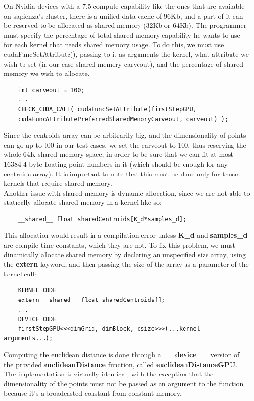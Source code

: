 \documentclass{article}
\begin{document}
On Nvidia devices with a 7.5 compute capability like the ones that are available on sapienza's cluster, there is a unified data cache of 96Kb, and a part of it can be reserved to be allocated as shared memory (32Kb or 64Kb). The programmer must specify the percentage of total shared memory capability he wants to use for each kernel that needs shared memory usage. To do this, we must use cudaFuncSetAttribute(), passing to it as arguments the kernel, what attribute we wish to set (in our case shared memory carveout), and the percentage of shared memory we wish to allocate.
\begin{lstlisting}
    int carveout = 100;
    ...
    CHECK_CUDA_CALL( cudaFuncSetAttribute(firstStepGPU,
    cudaFuncAttributePreferredSharedMemoryCarveout, carveout) );
\end{lstlisting}
Since the centroids array can be arbitrarily big, and the dimensionality of points can go up to 100 in our test cases, we set the carveout to 100, thus reserving the whole 64K shared memory space, in order to be sure that we can fit at most 16384 4 byte floating point numbers in it (which should be enough for any centroids array). It is important to note that this must be done only for those kernels that require shared memory. \\ 
Another issue with shared memory is dynamic allocation, since we are not able to statically allocate shared memory in a kernel like so:
\begin{lstlisting}
    __shared__ float sharedCentroids[K_d*samples_d];
\end{lstlisting}
This allocation would result in a compilation error unless \textbf{K\_d} and \textbf{samples\_d} are compile time constants, which they are not. To fix this problem, we must dinamically allocate shared memory by declaring an unspecified size array, using the \textbf{extern} keyword, and then passing the size of the array as a parameter of the kernel call:
\begin{lstlisting}
    KERNEL CODE
    extern __shared__ float sharedCentroids[];
    ...
    DEVICE CODE
    firstStepGPU<<<dimGrid, dimBlock, csize>>>(...kernel arguments...);
\end{lstlisting}
Computing the euclidean distance is done through a \textbf{\_\_device\_\_} version of the provided \textbf{euclideanDistance} function, called \textbf{euclideanDistanceGPU}. The implementation is virtually identical, with the exception that the dimensionality of the points must not be passed as an argument to the function because it's a broadcasted constant from constant memory.
\end{document}
